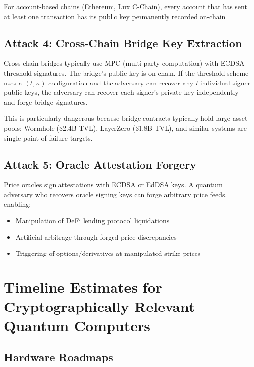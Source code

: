 \documentclass[11pt,a4paper]{article}
\begin{document}
For account-based chains (Ethereum, Lux C-Chain), every account that has sent at
least one transaction has its public key permanently recorded on-chain.

\subsection{Attack 4: Cross-Chain Bridge Key Extraction}

Cross-chain bridges typically use MPC (multi-party computation) with ECDSA threshold
signatures. The bridge's public key is on-chain. If the threshold scheme uses a
$(t, n)$ configuration and the adversary can recover any $t$ individual signer public
keys, the adversary can recover each signer's private key independently and forge
bridge signatures.

This is particularly dangerous because bridge contracts typically hold large asset
pools: Wormhole (\$2.4B TVL), LayerZero (\$1.8B TVL), and similar systems are
single-point-of-failure targets.

\subsection{Attack 5: Oracle Attestation Forgery}

Price oracles sign attestations with ECDSA or EdDSA keys. A quantum adversary who
recovers oracle signing keys can forge arbitrary price feeds, enabling:

\begin{itemize}[leftmargin=2em]
  \item Manipulation of DeFi lending protocol liquidations
  \item Artificial arbitrage through forged price discrepancies
  \item Triggering of options/derivatives at manipulated strike prices
\end{itemize}

\section{Timeline Estimates for Cryptographically Relevant Quantum Computers}
\label{sec:timeline}

\subsection{Hardware Roadmaps}
\end{document}
